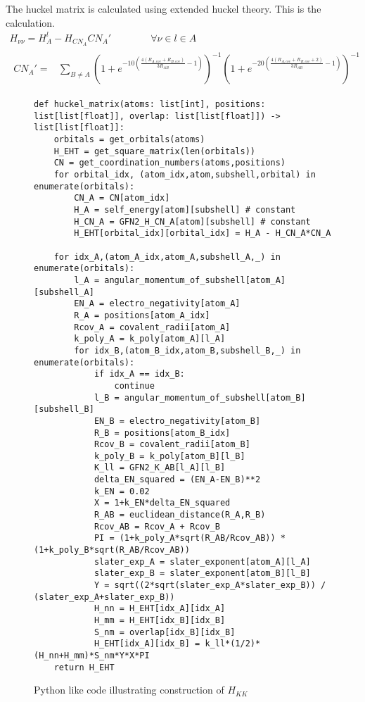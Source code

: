 The huckel matrix is calculated using extended huckel theory. This is the calculation.
\begin{gather}
    H_{\nu\nu} = H_A^l - H_{CN_A}CN_A' \quad\quad\quad\quad\forall \nu \in l \in A\\
    \begin{split}
        CN_A' = &\sum_{B\neq A}\left(1+e^{-10\left(\frac{4\left(R_{A,cov}+R_{B,cov}\right)}{3R_{AB}}-1\right)}\right)^{-1}\left(1+e^{-20\left(\frac{4\left(R_{A,cov}+R_{B,cov}+2\right)}{3R_{AB}}-1\right)}\right)^{-1}
    \end{split}
\end{gather}
\begin{figure}[H]
\begin{verbatim}
def huckel_matrix(atoms: list[int], positions: list[list[float]], overlap: list[list[float]]) -> list[list[float]]:
    orbitals = get_orbitals(atoms)
    H_EHT = get_square_matrix(len(orbitals))
    CN = get_coordination_numbers(atoms,positions)
    for orbital_idx, (atom_idx,atom,subshell,orbital) in enumerate(orbitals):
        CN_A = CN[atom_idx]
        H_A = self_energy[atom][subshell] # constant
        H_CN_A = GFN2_H_CN_A[atom][subshell] # constant
        H_EHT[orbital_idx][orbital_idx] = H_A - H_CN_A*CN_A

    for idx_A,(atom_A_idx,atom_A,subshell_A,_) in enumerate(orbitals):
        l_A = angular_momentum_of_subshell[atom_A][subshell_A]
        EN_A = electro_negativity[atom_A]
        R_A = positions[atom_A_idx]
        Rcov_A = covalent_radii[atom_A]
        k_poly_A = k_poly[atom_A][l_A]
        for idx_B,(atom_B_idx,atom_B,subshell_B,_) in enumerate(orbitals):
            if idx_A == idx_B:
                continue
            l_B = angular_momentum_of_subshell[atom_B][subshell_B]
            EN_B = electro_negativity[atom_B]
            R_B = positions[atom_B_idx]
            Rcov_B = covalent_radii[atom_B]
            k_poly_B = k_poly[atom_B][l_B]
            K_ll = GFN2_K_AB[l_A][l_B]
            delta_EN_squared = (EN_A-EN_B)**2
            k_EN = 0.02
            X = 1+k_EN*delta_EN_squared
            R_AB = euclidean_distance(R_A,R_B) 
            Rcov_AB = Rcov_A + Rcov_B 
            PI = (1+k_poly_A*sqrt(R_AB/Rcov_AB)) * (1+k_poly_B*sqrt(R_AB/Rcov_AB))
            slater_exp_A = slater_exponent[atom_A][l_A]
            slater_exp_B = slater_exponent[atom_B][l_B]
            Y = sqrt((2*sqrt(slater_exp_A*slater_exp_B)) / (slater_exp_A+slater_exp_B))
            H_nn = H_EHT[idx_A][idx_A]
            H_mm = H_EHT[idx_B][idx_B]
            S_nm = overlap[idx_B][idx_B]
            H_EHT[idx_A][idx_B] = k_ll*(1/2)*(H_nn+H_mm)*S_nm*Y*X*PI
    return H_EHT
\end{verbatim}
\caption{Python like code illustrating construction of $H_{KK}$}
\end{figure}


